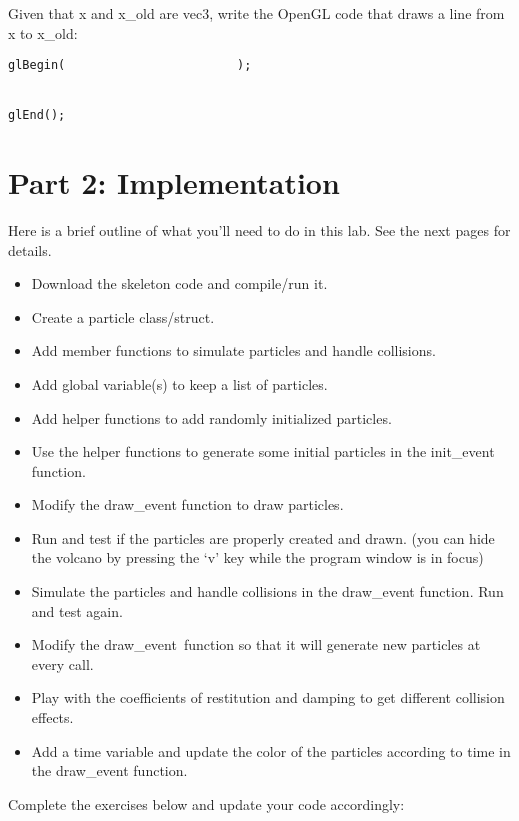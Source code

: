\documentclass[12pt]{article}
\newcounter{problem}
\newcounter{problempart}[problem]
\newcounter{solutionpart}[problem]
\newenvironment{problem}{\stepcounter{problem}\noindent{\bf\arabic{problem}.}}{\setcounter{problempart}{0}\setcounter{solutionpart}{0}}
\begin{document}
\begin{problem}
Given that x and x\_old are vec3, write the OpenGL code that draws a
line from x to x\_old:
\end{problem}
\begin{lstlisting}
glBegin(                        );


glEnd();
\end{lstlisting}



\section*{Part 2: Implementation}

Here is a brief outline of what you'll need to do in this lab. See the
next pages for details.

\begin{itemize}
\item
  Download the skeleton code and compile/run it.
\item
  Create a particle class/struct.
\item
  Add member functions to simulate particles and handle collisions.
\item
  Add global variable(s) to keep a list of particles.
\item
  Add helper functions to add randomly initialized particles.
\item
  Use the helper functions to generate some initial particles in the init\_event function.
\item
  Modify the draw\_event function to draw particles.
\item
  Run and test if the particles are properly created and drawn. (you can hide the volcano by pressing the `v' key while the program window is in focus)
\item
  Simulate the particles and handle collisions in the draw\_event
  function. Run and test again.
\item
  Modify the draw\_event~function so that it will generate new particles
  at every call.
\item
  Play with the coefficients of restitution and damping to get different
  collision effects.
\item
  Add a time variable and update the color of the particles according to time in the draw\_event function.
\end{itemize}

Complete the exercises below and update your code accordingly:
\end{document}
